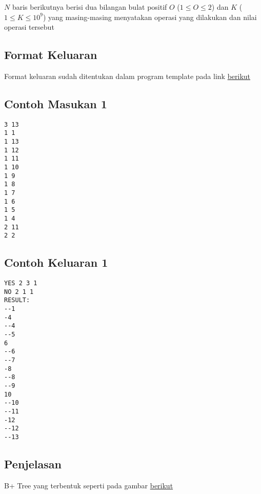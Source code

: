 \documentclass{article}
\begin{document}
$N$ baris berikutnya berisi dua bilangan bulat positif $O$ ($1 \leq O \leq 2$) dan $K$ ($1 \leq K \leq 10^{9}$) yang masing-masing menyatakan operasi yang dilakukan dan nilai operasi tersebut

\subsection*{Format Keluaran}

Format keluaran sudah ditentukan dalam program template pada link \href{https://drive.google.com/drive/folders/19CcSmHoxypupEgl6w9DckooEcUfqM3qY?usp=sharing}{berikut}

\begin{multicols}{2}
\subsection*{Contoh Masukan 1}
\noindent
\begin{lstlisting}
3 13
1 1
1 13
1 12
1 11
1 10
1 9
1 8
1 7
1 6
1 5
1 4
2 11
2 2
\end{lstlisting}
\vfill
\null
\columnbreak
\subsection*{Contoh Keluaran 1}
\begin{lstlisting}
YES 2 3 1
NO 2 1 1
RESULT:
--1
-4
--4
--5
6
--6
--7
-8
--8
--9
10
--10
--11
-12
--12
--13

\end{lstlisting}
\end{multicols}


\subsection*{Penjelasan}

B+ Tree yang terbentuk seperti pada gambar \href{https://drive.google.com/file/d/1pot9zNXOrSjS-J8ebY-b_D8aXAC7xbT4/view?usp=sharing}{berikut}
\end{document}
